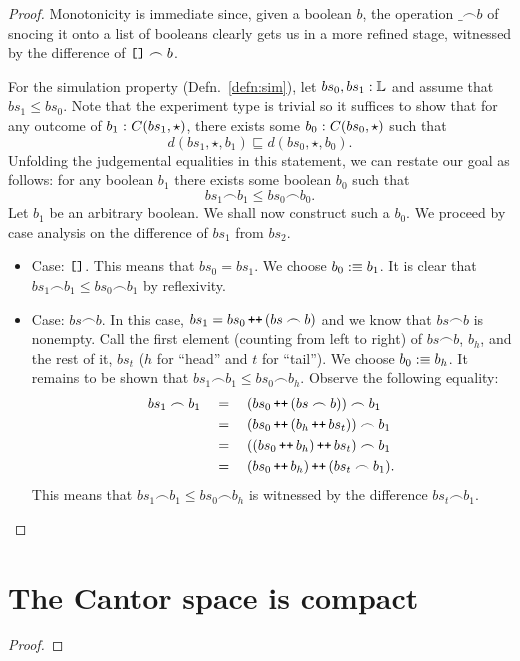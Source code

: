 \begin{proof}
  Monotonicity is immediate since, given a boolean $b$, the operation $\_ \frown b$ of snocing
  it onto a list of booleans clearly gets us in a more refined stage, witnessed by the
  difference of $\text{\texttt{[]}}{} \frown b$.

  For the simulation property (Defn.~\ref{defn:sim}), let $bs_0, bs_1:\mathbb{L}{}$
  and assume that $bs_1 \le bs_0$. Note that the experiment type is trivial so it suffices
  to show that for any outcome of $b_1\hspace{0.1mm}:\hspace{0.1mm}C(bs_1, \star)$, there exists some
  $b_0\hspace{0.1mm}:\hspace{0.1mm}C(bs_0, \star)$ such that
  \begin{equation*}
    d(bs_1, \star, b_1) \sqsubseteq d(bs_0, \star, b_0).
  \end{equation*}
  Unfolding the judgemental equalities in this statement, we can restate our goal as
  follows: for any boolean $b_1$ there exists some boolean $b_0$ such that
  \begin{equation*}
    bs_1 \frown b_1 \le bs_0 \frown b_0.
  \end{equation*}
  Let $b_1$ be an arbitrary boolean. We shall now construct such a $b_0$. We proceed by
  case analysis on the difference of $bs_1$ from $bs_2$.
  \begin{itemize}
    \item Case: $\text{\texttt{[]}}{}$. This means that $bs_0 = bs_1$. We choose
      $b_0 :\equiv b_1$. It is clear that $bs_1 \frown b_1 \le bs_0 \frown b_1$ by reflexivity.
    \item Case: $bs \frown b$. In this case, $bs_1 = bs_0 \operatorname{\text{\texttt{++}}}{} (bs \frown b)$ and we know that
      $bs \frown b$ is nonempty. Call the first element (counting from left to right) of $bs \frown
      b$, $b_h$, and the rest of it, $bs_t$ ($h$ for ``head'' and $t$ for ``tail''). We
      choose $b_0 :\equiv b_h$. It remains to be shown that $bs_1 \frown b_1 \le bs_0 \frown b_h$. Observe
      the following equality:
      \begin{align*}
        bs_1 \frown b_1 \quad&=\quad (bs_0 \operatorname{\text{\texttt{++}}}{} (bs \frown b)) \frown b_1             \\
                   \quad&=\quad (bs_0 \operatorname{\text{\texttt{++}}}{} (b_h \operatorname{\text{\texttt{++}}}{} bs_t)) \frown b_1 \\
                   \quad&=\quad ((bs_0 \operatorname{\text{\texttt{++}}}{} b_h) \operatorname{\text{\texttt{++}}}{} bs_t) \frown b_1 \\
                   \quad&=\quad (bs_0 \operatorname{\text{\texttt{++}}}{} b_h) \operatorname{\text{\texttt{++}}}{} (bs_t \frown b_1) .
      \end{align*}
      This means that $bs_1 \frown b_1 \le bs_0 \frown b_h$ is witnessed by the difference
      $bs_t \frown b_1$.
  \end{itemize}
\end{proof}

\section{The Cantor space is compact}

\begin{defn}[Compactness]
\end{defn}

\begin{thm}
\end{thm}
\begin{proof}
\end{proof}
